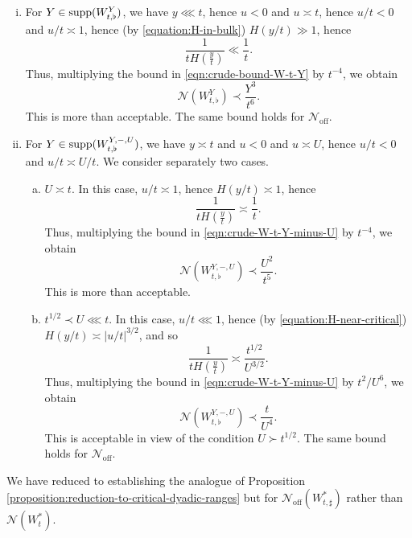 \documentclass[reqno]{amsart} 
\begin{document}
\begin{enumerate}[(i)]
\item For $Y \in \operatorname{supp}(W_{t,\flat}^{Y})$, we have $y \lll t$, hence $u < 0$ and $u \asymp t$, hence $u/t < 0$ and $u/t \asymp 1$, hence (by \eqref{equation:H-in-bulk}) $H (y/t) \gg 1$, hence
  \begin{equation*}
    \frac{1}{t H (\tfrac{y}{t})} \ll \frac{1}{t}.
  \end{equation*}
  Thus, multiplying the bound in \eqref{eqn:crude-bound-W-t-Y} by $t ^{- 4}$, we obtain
  \begin{equation*}
    \mathcal{N} (W _{t, \flat} ^{Y} ) \prec  \frac{Y ^3 }{t^6}.
  \end{equation*}
  This is more than acceptable.  The same bound holds for $\mathcal{N} _{\mathrm{off}}$.
\item For $Y \in \operatorname{supp} (W _{t, \flat} ^{Y, -, U})$, we have $y \asymp t$ and $u <0$ and $u \asymp U$, hence $u/t < 0$ and $u/t \asymp U/t$.  We consider separately two cases.
  \begin{enumerate}[(a)]
  \item $U \asymp t$.  In this case, $u/t \asymp 1$, hence $H (y/t) \asymp 1$, hence
    \begin{equation*}
      \frac{1}{t H (\tfrac{y}{t})} \asymp \frac{1}{t}.
    \end{equation*}
    Thus, multiplying the bound in \eqref{eqn:crude-W-t-Y-minus-U} by $t ^{- 4}$, we obtain
    \begin{equation*}
      \mathcal{N} (W _{t, \flat} ^{Y,-,U} ) \prec  \frac{U^2 }{t^5}.
    \end{equation*}
    This is more than acceptable.
  \item $t ^{1/2} \prec U \lll t$.  In this case, $u/t \lll 1$, hence (by \eqref{equation:H-near-critical}) $H(y/t) \asymp |u/t|^{3/2}$, and so
    \begin{equation*}
      \frac{1}{t H (\tfrac{y}{t})} \asymp \frac{t ^{1/2} }{U ^{3/2} }.
    \end{equation*}
    Thus, multiplying the bound in \eqref{eqn:crude-W-t-Y-minus-U} by $t ^2 / U^6$, we obtain
    \begin{equation*}
      \mathcal{N} (W _{t, \flat} ^{Y,-,U} ) \prec  \frac{t }{U^4}.
    \end{equation*}
    This is acceptable in view of the condition $U \succ t ^{1/2}$.    The same bound holds for $\mathcal{N} _{\mathrm{off}}$.
  \end{enumerate}
\end{enumerate}
We have reduced to establishing the analogue of Proposition \ref{proposition:reduction-to-critical-dyadic-ranges} but for $\mathcal{N}_{\mathrm{off}}(W_{t,\sharp}^{*})$ rather than $\mathcal{N}(W_{t}^{*})$.
\end{document}
